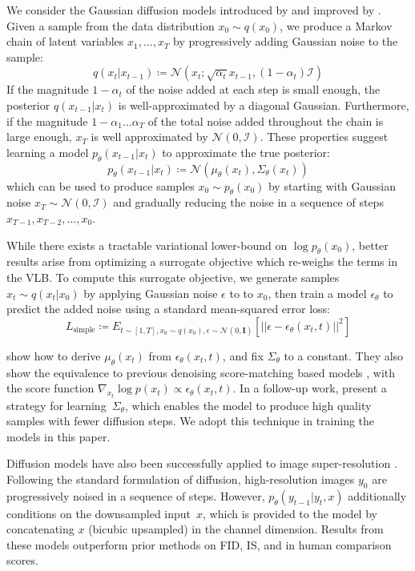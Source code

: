 \documentclass{article}
\begin{document}
We consider the Gaussian diffusion models introduced by \citet{dickstein} and improved by \citet{scorematching,ddpm}. Given a sample from the data distribution $x_0 \sim q(x_0)$, we produce a Markov chain of latent variables $x_1, ..., x_T$ by progressively adding Gaussian noise to the sample:
$$q(x_t | x_{t-1}) \coloneqq \mathcal{N}(x_t; \sqrt{\alpha_t} x_{t-1}, (1-\alpha_t)\mathcal{I})$$
If the magnitude $1-\alpha_t$ of the noise added at each step is small enough, the posterior $q(x_{t-1} | x_{t})$ is well-approximated by a diagonal Gaussian. Furthermore, if the magnitude $1 -\alpha_1 ... \alpha_T$ of the total noise added throughout the chain is large enough, $x_T$ is well approximated by $\mathcal{N}(0, \mathcal{I})$. These properties suggest learning a model $p_\theta(x_{t-1} | x_t)$ to approximate the true posterior:
$$p_{\theta}(x_{t-1}|x_t) \coloneqq \mathcal{N}(\mu_{\theta}(x_t), \Sigma_{\theta}(x_t))$$
which can be used to produce samples $x_0 \sim p_\theta(x_0)$ by starting with Gaussian noise $x_T \sim \mathcal{N}(0, \mathcal{I})$ and gradually reducing the noise in a sequence of steps $x_{T-1}, x_{T-2}, ..., x_0$.

While there exists a tractable variational lower-bound on $\log p_\theta(x_0)$, better results arise from optimizing a surrogate objective which re-weighs the terms in the VLB. To compute this surrogate objective, we generate samples $x_t \sim q(x_t | x_0)$ by applying Gaussian noise $\epsilon$ to to $x_0$, then train a model $\epsilon_{\theta}$ to predict the added noise using a standard mean-squared error loss:
$$L_{\text{simple}} \coloneqq E_{t \sim [1,T],x_0 \sim q(x_0), \epsilon \sim \mathcal{N}(0, \mathbf{I})}[||\epsilon - \epsilon_{\theta}(x_t, t)||^2] \label{eq:lsimple}$$

\citet{ddpm} show how to derive $\mu_{\theta}(x_t)$ from $\epsilon_{\theta}(x_t, t)$, and fix $\Sigma_{\theta}$ to a constant. They also show the equivalence to previous denoising score-matching based models \cite{scorematching,improvedscore}, with the score function $\nabla_{x_t} \log p(x_t) \propto \epsilon_{\theta}(x_t, t)$. In a follow-up work, \citet{improved} present a strategy for learning~$\Sigma_{\theta}$, which enables the model to produce high quality samples with fewer diffusion steps. We adopt this technique in training the models in this paper.

Diffusion models have also been successfully applied to image super-resolution \cite{improved,sr3}. Following the standard formulation of diffusion, high-resolution images $y_0$ are progressively noised in a sequence of steps. However, $p_\theta(y_{t-1} | y_t, x)$ additionally conditions on the downsampled input~$x$, which is provided to the model by concatenating $x$ (bicubic upsampled) in the channel dimension. Results from these models outperform prior methods on FID, IS, and in human comparison scores.
\end{document}
